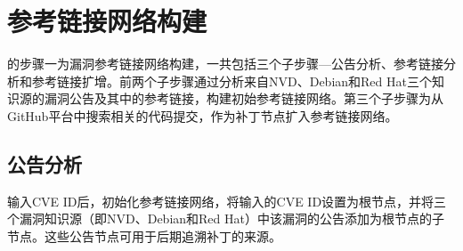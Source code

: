
\section{参考链接网络构建}
\tool 的步骤一为漏洞参考链接网络构建，一共包括三个子步骤---公告分析、参考链接分析和参考链接扩增。前两个子步骤通过分析来自NVD、Debian和Red Hat三个知识源的漏洞公告及其中的参考链接，构建初始参考链接网络。第三个子步骤为从GitHub平台中搜索相关的代码提交，作为补丁节点扩入参考链接网络。

\subsection{公告分析} \label{sec:advisory analysis}
输入CVE ID后，\tool 初始化参考链接网络，将输入的CVE ID设置为根节点，并将三个漏洞知识源（即NVD、Debian和Red Hat）中该漏洞的公告添加为根节点的子节点。这些公告节点可用于后期追溯补丁的来源。%

